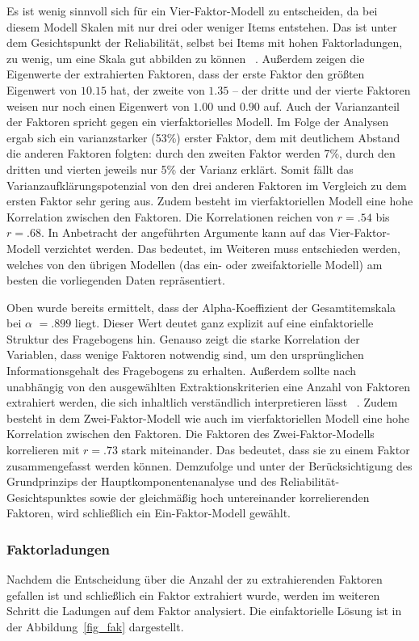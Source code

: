 \documentclass[12pt,a4paper]{article}
\begin{document}
	Es ist wenig sinnvoll sich für ein Vier-Faktor-Modell zu entscheiden, da bei diesem Modell Skalen mit nur drei oder weniger Items entstehen. Das ist unter dem Gesichtspunkt der Reliabilität, selbst bei Items mit hohen Faktorladungen, zu wenig, um eine Skala gut abbilden zu können ~\parencite[S.~228]{Buehner}. Außerdem zeigen die Eigenwerte der extrahierten Faktoren, dass der erste Faktor den größten Eigenwert von $10.15$ hat, der zweite von $1.35$ –  der dritte und der vierte Faktoren weisen nur noch einen Eigenwert von $1.00$ und $0.90$ auf. Auch der Varianzanteil der Faktoren spricht gegen ein vierfaktorielles Modell. Im Folge der Analysen ergab sich ein varianzstarker (53\%) erster Faktor, dem mit deutlichem Abstand die anderen Faktoren folgten: durch den zweiten Faktor werden 7\%, durch den dritten und vierten jeweils nur 5\% der Varianz erklärt. Somit fällt das Varianzaufklärungspotenzial von den drei anderen Faktoren im Vergleich zu dem ersten Faktor sehr gering aus. Zudem besteht im vierfaktoriellen Modell eine hohe Korrelation zwischen den Faktoren. Die Korrelationen reichen von $r = .54$ bis $r = .68$. In Anbetracht der angeführten Argumente kann auf das Vier-Faktor-Modell verzichtet werden. Das bedeutet, im Weiteren muss entschieden werden, welches von den übrigen Modellen (das ein- oder zweifaktorielle Modell) am besten die vorliegenden Daten repräsentiert.
	
	Oben wurde bereits ermittelt, dass der Alpha-Koeffizient der Gesamtitemskala bei $\alpha$ $= .899$ liegt. Dieser Wert deutet ganz explizit auf eine einfaktorielle Struktur des Fragebogens hin. Genauso zeigt die starke Korrelation der Variablen, dass wenige Faktoren notwendig sind, um den ursprünglichen Informationsgehalt des Fragebogens zu erhalten. Außerdem sollte nach~\textcite{Buehner} unabhängig von den ausgewählten Extraktionskriterien eine Anzahl von Faktoren extrahiert werden, die sich inhaltlich verständlich interpretieren lässt ~\parencite[S.~202]{Buehner}. Zudem besteht in dem Zwei-Faktor-Modell wie auch im vierfaktoriellen Modell eine hohe Korrelation zwischen den Faktoren. Die Faktoren des Zwei-Faktor-Modells korrelieren mit $r = .73$ stark miteinander. Das bedeutet, dass sie zu einem Faktor zusammengefasst werden können. Demzufolge und unter der Berücksichtigung des Grundprinzips der Hauptkomponentenanalyse und des Reliabilität-Gesichtspunktes sowie der gleichmäßig hoch untereinander korrelierenden Faktoren, wird schließlich ein Ein-Faktor-Modell gewählt.
	

\subsubsection{Faktorladungen}
Nachdem die Entscheidung über die Anzahl der zu extrahierenden Faktoren gefallen ist und schließlich ein Faktor extrahiert wurde, werden im weiteren Schritt die Ladungen auf dem Faktor analysiert. Die einfaktorielle Lösung ist in der Abbildung~\ref{fig_fak} dargestellt.
\end{document}

